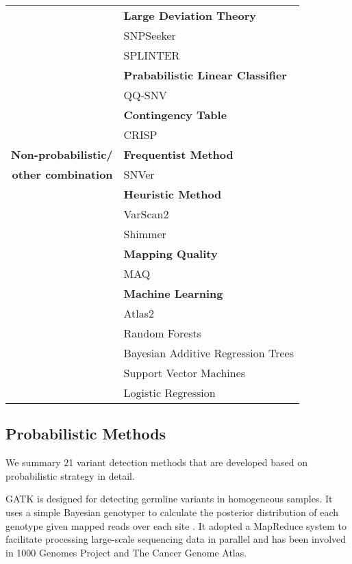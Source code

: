 \documentclass[11pt,reqno]{amsart}
\begin{document}
\begin{table}[htbp]
\begin{tabular}{rr}
          & \multicolumn{1}{l}{\textbf{Large Deviation Theory}} \\
          & \multicolumn{1}{l}{SNPSeeker} \\
          & \multicolumn{1}{l}{SPLINTER} \\
          & \multicolumn{1}{l}{\textbf{Prababilistic Linear Classifier }} \\
          & \multicolumn{1}{l}{QQ-SNV} \\
          & \multicolumn{1}{l}{\textbf{Contingency Table }} \\
          & \multicolumn{1}{l}{CRISP} \\
          \midrule
    \textbf{Non-probabilistic/} & \multicolumn{1}{l}{\textbf{Frequentist Method}} \\
    \textbf{other combination} & \multicolumn{1}{l}{SNVer} \\
         & \multicolumn{1}{l}{\textbf{Heuristic Method}} \\
         & \multicolumn{1}{l}{VarScan2} \\
         & \multicolumn{1}{l}{Shimmer} \\
         & \multicolumn{1}{l}{\textbf{Mapping Quality}} \\
         & \multicolumn{1}{l}{MAQ} \\
         & \multicolumn{1}{l}{\textbf{Machine Learning}} \\
         & \multicolumn{1}{l}{Atlas2} \\
         & \multicolumn{1}{l}{Random Forests} \\
         & \multicolumn{1}{l}{Bayesian Additive Regression Trees} \\
         & \multicolumn{1}{l}{Support Vector Machines} \\
         & \multicolumn{1}{l}{Logistic Regression} \\
    \bottomrule
    \end{tabular}
\end{table}


\subsection{Probabilistic Methods}
We summary 21 variant detection methods that are developed based on probabilistic strategy in detail.

GATK \citep{McKenna2010} is designed for detecting germline variants in homogeneous samples.
It uses a simple Bayesian genotyper to calculate the posterior distribution of each genotype given mapped reads over each site \citep{depristo2011framework}.
It adopted a MapReduce system to facilitate processing large-scale sequencing data in parallel and has been involved in 1000 Genomes Project and The Cancer Genome Atlas.
\end{document}
